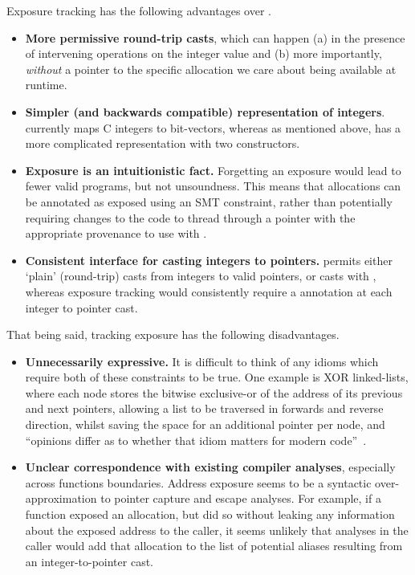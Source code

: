 Exposure tracking has the following advantages over .
\begin{itemize}
    \item \textbf{More permissive round-trip casts}, which can happen (a) in
        the presence of intervening operations on the integer value and (b)
        more importantly, \emph{without} a pointer to the specific allocation
        we care about being available at runtime.
    \item \textbf{Simpler (and backwards compatible) representation of
        integers}.  currently maps C integers to bit-vectors, whereas
        as mentioned above,  has a more complicated representation
        with two constructors.
    \item \textbf{Exposure is an intuitionistic fact.} Forgetting an exposure
        would lead to fewer valid programs, but not unsoundness. This
        means that allocations can be annotated as exposed using an SMT
        constraint, rather than potentially requiring changes to the code
        to thread through a pointer with the appropriate provenance to
        use with .
    \item \textbf{Consistent interface for casting integers to pointers.}
         permits either `plain' (round-trip) casts from integers to
        valid pointers, or casts with , whereas exposure
        tracking would consistently require a  annotation at each
        integer to pointer cast.
\end{itemize}

That being said, tracking exposure has the following disadvantages.
\begin{itemize}
    \item \textbf{Unnecessarily expressive.} It is difficult to think of any
        idioms which require both of these constraints to be true. One example
        is XOR linked-lists, where each node stores the bitwise exclusive-or of
        the address of its previous and next pointers, allowing a list to be
        traversed in forwards and reverse direction, whilst saving the space
        for an additional pointer per node, and ``opinions differ as to whether
        that idiom matters for modern code''~.
    \item \textbf{Unclear correspondence with existing compiler analyses},
        especially across functions boundaries. Address exposure seems to be a
        syntactic over-approximation to pointer capture and escape
        analyses.
        For example, if a function exposed an allocation, but did so without
        leaking any information about the exposed address to the caller, it
        seems unlikely that analyses in the caller would add that allocation to
        the list of potential aliases resulting from an integer-to-pointer
        cast.
\end{itemize}

